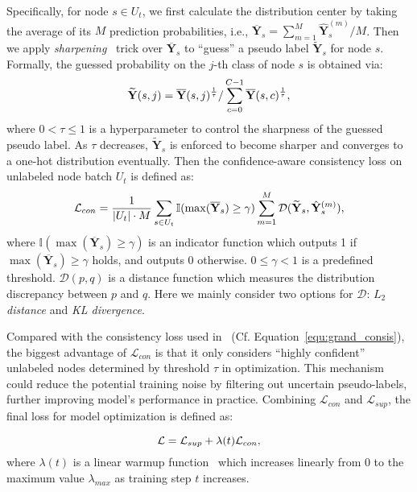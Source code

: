Specifically, for node $s \in U_t$, we first calculate the distribution center by taking the average of its $M$ prediction probabilities, i.e., $\overline{\mathbf{Y}}_s=\sum_{m=1}^M \hat{\mathbf{Y}}^{(m)}_s/M$. Then we apply \textit{sharpening}~\cite{sohn2020fixmatch} trick over $\overline{\mathbf{Y}}_s$ to ``guess'' a pseudo label $\widetilde{\mathbf{Y}}_s$ for node $s$. Formally, the guessed probability on the $j$-th class of node $s$ is obtained via:\begin{equation}
\small
\label{equ:sharp}
\widetilde{\mathbf{Y}}(s,j) = \overline{\mathbf{Y}}(s,j)^{\frac{1}{\tau}}/\sum_{c=0}^{C-1}\overline{\mathbf{Y}}(s,c)^{\frac{1}{\tau}}, 
\end{equation}
where $0< \tau \leq 1$ is a hyperparameter to control the sharpness of the guessed pseudo label.  As $\tau$ decreases, $\widetilde{\mathbf{Y}}_s$ is enforced to become sharper and converges to a one-hot distribution eventually. 
Then the confidence-aware consistency loss on unlabeled node batch $U_t$ is defined as: 
\begin{equation}
\small
\label{equ:consis}
\mathcal{L}_{con} = \frac{1}{|U_t|\cdot M}\sum_{s\in U_t} \mathbb{I}(\max(\overline{\mathbf{Y}}_s)\geq \gamma) \sum_{m=1}^M \mathcal{D}(\widetilde{\mathbf{Y}}_s, \hat{\mathbf{Y}}^{(m)}_s),
\end{equation} 
where $\mathbb{I}(\max(\overline{\mathbf{Y}}_s)\geq \gamma)$ is an indicator function which outputs 1 if $\max(\overline{\mathbf{Y}}_s)\geq \gamma$ holds, and outputs 0 otherwise. $0\leq \gamma < 1$ is a predefined threshold. $\mathcal{D}(p, q)$ is a distance function which measures the distribution discrepancy between $p$ and $q$. Here we mainly consider two options for $\mathcal{D}$: \textit{$L_2$ distance} and \textit{KL divergence}.

Compared with the consistency loss used in \grand\ (Cf. Equation~\ref{equ:grand_consis}), the biggest advantage of $\mathcal{L}_{con}$ is that it only considers ``highly confident'' unlabeled nodes determined by threshold $\tau$ in optimization. This mechanism could reduce the potential training noise by filtering out uncertain pseudo-labels, further improving model's performance in practice. Combining $\mathcal{L}_{con}$ and $\mathcal{L}_{sup}$, the final loss for model optimization is defined as:


\begin{equation}
\label{equ:total_loss}
\small
\mathcal{L} = \mathcal{L}_{sup} + \lambda(t) \mathcal{L}_{con},
\end{equation}
where $\lambda(t)$ is a linear warmup function~\cite{goyal2017accurate} which increases linearly from 0 to the maximum value $\lambda_{max}$ as training step $t$ increases. 

